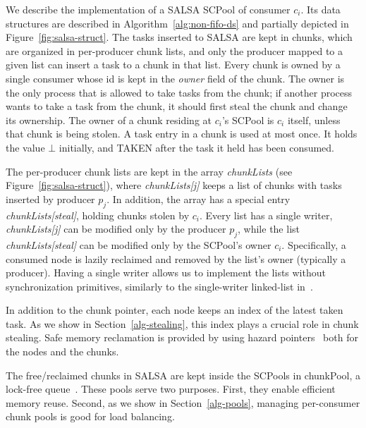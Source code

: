We describe the implementation of a SALSA SCPool of consumer $c_i$.
Its data structures are described in Algorithm~\ref{alg:non-fifo-ds} and partially depicted in Figure~\ref{fig:salsa-struct}. The tasks inserted to SALSA are kept in chunks, which are organized in per-producer chunk lists, and only the producer mapped to a given list can insert a task to a chunk in that list. Every chunk is owned by a single consumer whose id is kept in the \emph{owner} field of the chunk.
The owner is the only process that is allowed to take tasks from the chunk; if another process wants to take a task from the chunk, it should first steal the chunk and change its ownership. The owner of a chunk
residing at $c_i$'s SCPool is $c_i$ itself, unless that chunk is being stolen. A task entry in a chunk is used at most once. It holds the value $\bot$ initially, and TAKEN after the task it held has been consumed.

The per-producer chunk lists are kept in the array \emph{chunkLists} (see Figure~\ref{fig:salsa-struct}), where \emph{chunkLists[j]} keeps a list of chunks with tasks inserted by producer $p_j$. In addition, the array has a special entry \emph{chunkLists[steal]}, holding chunks stolen by $c_i$. Every list has a single writer, \emph{chunkLists[j]} can be modified only by the producer $p_j$, while the list \emph{chunkLists[steal]} can be modified only by the SCPool's owner $c_i$. Specifically, a consumed node is lazily reclaimed and removed by the list's owner (typically a producer). Having a single writer allows us to implement the lists without synchronization primitives, similarly to the single-writer linked-list in~\cite{Michael:2004:HPS:987524.987595}.

In addition to the chunk pointer, each node keeps an index of the latest taken task. As we show in Section~\ref{alg-stealing}, this index plays a crucial role in chunk stealing. Safe memory reclamation is provided by using hazard pointers~\cite{Michael:2004:HPS:987524.987595} both for the nodes and the chunks.

The free/reclaimed chunks in SALSA are kept inside the SCPools in chunkPool, a lock-free queue~\cite{Michael:1996:SFP:248052.248106}. These pools serve two purposes. First, they enable efficient memory reuse. Second, as we show in Section~\ref{alg-pools}, managing per-consumer chunk pools is good for load balancing. 